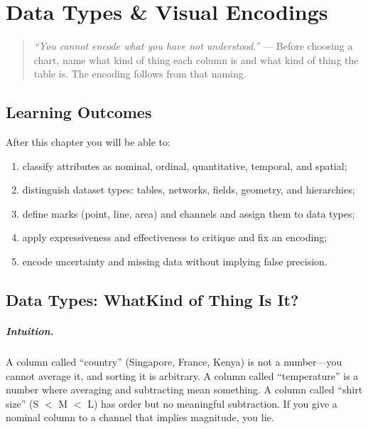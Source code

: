 \chapter{Data Types \& Visual Encodings}
\label{ch:encodings}
\sloppy

\begin{quote}
\emph{``You cannot encode what you have not understood.''} --- Before choosing a chart, name what kind of thing each column is and what kind of thing the table is. The encoding follows from that naming.
\end{quote}

\noindent{}
\vspace{0.4em}

\section*{Learning Outcomes}
After this chapter you will be able to:
\begin{enumerate}[label=(L\arabic*)]
    \item classify attributes as nominal, ordinal, quantitative, temporal, and spatial;
    \item distinguish dataset types: tables, networks, fields, geometry, and hierarchies;
    \item define marks (point, line, area) and channels and assign them to data types;
    \item apply expressiveness and effectiveness to critique and fix an encoding;
    \item encode uncertainty and missing data without implying false precision.
\end{enumerate}

\section{Data Types: WhatKind of Thing Is It?}
\label{sec:data-types}
\paragraph{Intuition.} A column called ``country'' (Singapore, France, Kenya) is not a number---you cannot average it, and sorting it is arbitrary. A column called ``temperature'' is a number where averaging and subtracting mean something. A column called ``shirt size'' (S $<$ M $<$ L) has order but no meaningful subtraction. If you give a nominal column to a channel that implies magnitude, you lie.

